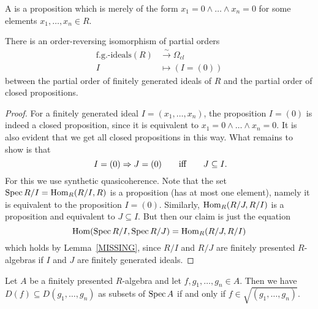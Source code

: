 \documentclass{zariski}
\begin{document}

\begin{definition}
  A  is a proposition
  which is merely of the form $x_1 = 0 \land \dots \land x_n = 0$
  for some elements $x_1, \dots, x_n \in R$.
\end{definition}

\begin{proposition}
  There is an order-reversing isomorphism of partial orders
  \begin{align*}
    \text{f.g.-ideals}(R) &\xrightarrow{{\sim}} \Omega_{cl} \\
    I &\mapsto (I = (0))
  \end{align*}
  between the partial order of finitely generated ideals of $R$
  and the partial order of closed propositions.
\end{proposition}

\begin{proof}
  For a finitely generated ideal $I = (x_1, \dots, x_n)$,
  the proposition $I = (0)$ is indeed a closed proposition,
  since it is equivalent to $x_1 = 0 \land \dots \land x_n = 0$.
  It is also evident that we get all closed propositions in this way.
  What remains to show is that
  \[ I = (0) \Rightarrow J = (0)
     \qquad\text{iff}\qquad
     J \subseteq I
     \rlap{\text{.}}
  \]
  For this we use synthetic quasicoherence.
  Note that the set $\operatorname{Spec} R/I = \mathrm{Hom}_R(R/I, R)$ is a proposition
  (has at most one element),
  namely it is equivalent to the proposition $I = (0)$.
  Similarly, $\mathrm{Hom}_R(R/J, R/I)$ is a proposition
  and equivalent to $J \subseteq I$.
  But then our claim is just the equation
  \[ \mathrm{Hom}(\operatorname{Spec} R/I, \operatorname{Spec} R/J) = \mathrm{Hom}_R(R/J, R/I) \]
  which holds by Lemma~\ref{MISSING},
  since $R/I$ and $R/J$ are finitely presented $R$-algebras
  if $I$ and $J$ are finitely generated ideals.
\end{proof}

\begin{lemma}
  Let $A$ be a finitely presented $R$-algebra
  and let $f, g_1, \dots, g_n \in A$.
  Then we have $D(f) \subseteq D(g_1, \dots, g_n)$
  as subsets of $\operatorname{Spec} A$
  if and only if $f \in \sqrt{(g_1, \dots, g_n)}$.
\end{lemma}
\end{document}
